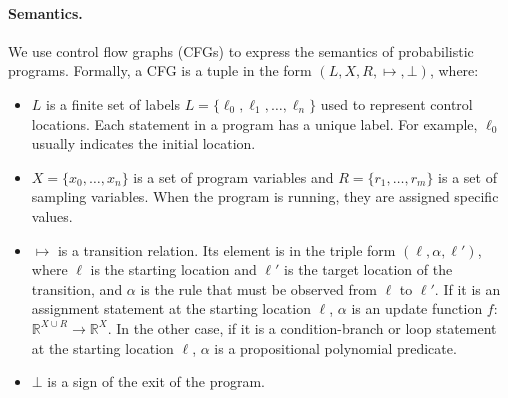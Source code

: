 \documentclass[runningheads]{llncs}
\begin{document}
\paragraph{Semantics.} We use control flow graphs (CFGs) to express the semantics of probabilistic programs. Formally, a CFG is a tuple in the form $(L,X,R,\mapsto,\bot)$, where:
\renewcommand{\labelitemi}{$\vcenter{\hbox{\tiny$\bullet$}}$}
\begin{itemize}
	\item $L$ is a finite set of labels $L=\{\ell_0,\ell_1,\dots,\ell_n\}$ used to represent control locations. Each statement in a program has a unique label. For example, $\ell_0$ usually indicates the initial location.
	
	\item $X=\{x_0,\dots,x_n\}$ is a set of program variables and $R=\{r_1,\dots,r_m\}$ is a set of sampling variables. When the program is running, they are assigned specific values.
	
	\item $\mapsto$ is a transition relation. Its element is in the triple form  $(\ell,\alpha,\ell')$, where $\ell$ is the starting location and $\ell'$ is the target location of the transition, and $\alpha$ is the rule that must be observed 
	from $\ell$ to $\ell'$. If it is an assignment statement at the starting location $\ell$, $\alpha$ is an update function $f$: $\mathbb{R}^{X\cup R}\to \mathbb{R}^{X}$. In the other case, if it is a condition-branch or loop statement at the starting location $\ell$, $\alpha$ is a propositional polynomial predicate.
	
	\item $\bot$ is a sign of the exit of the program.
\end{itemize}
\end{document}
